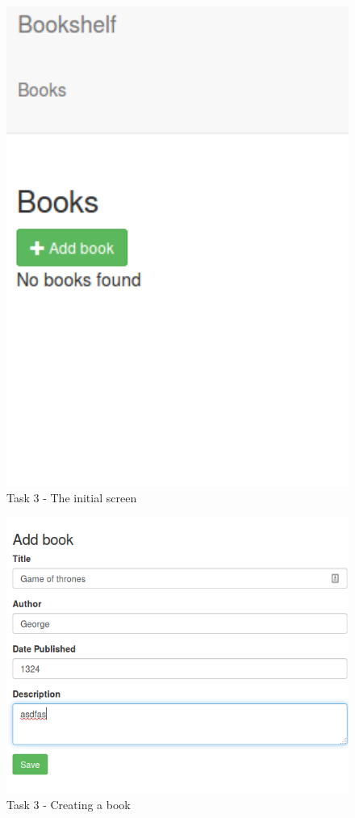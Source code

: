 \documentclass{article}
\begin{document}
	\begin{figure}[ht]
		\includegraphics[width=5in]{img/t3s1.png}
		\centering
		\caption{Task 3 - The initial screen}
	\end{figure}
	\begin{figure}[ht]
		\includegraphics[width=5in]{img/t3s2.png}
		\centering
        \caption{Task 3 - Creating a book}
	\end{figure}
\end{document}
